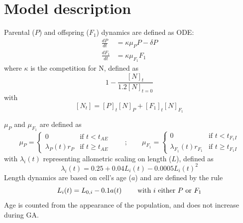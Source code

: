 \documentclass[a4paper,oneside]{article}
\begin{document}
  \section*{Model description}
    Parental ($P$) and offspring ($F_{1}$) dynamics are defined as ODE:\@
    \begin{align}
      \frac{dP}{dt}     &= \kappa \mu_{P} P - \delta P \\
      \frac{dF_{1}}{dt} &= \kappa \mu_{F_{1}} F_{1}
    \end{align}
    where $\kappa$ is the competition for N, defined as
    \[
      1 - \frac{{[N]}_{t}}{1.2{[N]}_{t=0}}
    \]
    with 
    \[
      [N_{t}] = {[P]}_{t} {[N]}_{P} + {[F_{1}]}_{t} {[N]}_{F_{1}}
    \]

    $\mu_{P}$ and $\mu_{F_{1}}$ are defined as
    \[
      \mu_{P} =
        \begin{cases}
          0                    & \mbox{if } t <    t_{AE} \\
          \lambda_{P}(t) r_{P} & \mbox{if } t \geq t_{AE}
        \end{cases}
      \qquad;\qquad
      \mu_{F_{1}} = 
        \begin{cases}
          0                            & \mbox{if } t <    t_{F_{1}I} \\
          \lambda_{F_{1}}(t) r_{F_{1}} & \mbox{if } t \geq t_{F_{1}I}
        \end{cases}
    \]
    with $\lambda_i(t)$ representing allometric scaling on length ($L$), defined as
    \[
      \lambda_{i}(t) = 0.25 + 0.04 L_{i}(t) - 0.0005 L_{i}{(t)}^{2}
    \]
    Length dynamics are based on cell's age ($a$) and are defined by the rule
    \[
      L_{i}(t) = L_{0,i} - 0.1 a(t) \hspace{8mm}\text{with $i$ either $P$ or $F_{1}$}
    \]
    Age is counted from the appearance of the population, and does not increase during GA.\@
\end{document}

